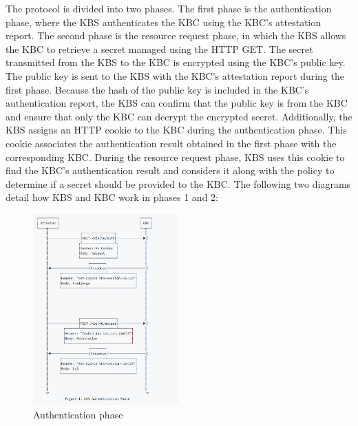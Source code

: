 The protocol is divided into two phases. The first phase is the authentication phase, where the KBS authenticates the KBC using the KBC's attestation report. The second phase is the resource request phase, in which the KBS allows the KBC to retrieve a secret managed using the HTTP GET.  
The secret transmitted from the KBS to the KBC is encrypted using the KBC's public key. The public key is sent to the KBS with the KBC's attestation report during the first phase. Because the hash of the public key is included in the KBC's authentication report, the KBS can confirm that the public key is from the KBC and ensure that only the KBC can decrypt the encrypted secret. Additionally, the KBS assigns an HTTP cookie to the KBC during the authentication phase. This cookie associates the authentication result obtained in the first phase with the corresponding KBC. During the resource 
request phase, KBS uses this cookie to find the KBC's authentication result and considers it along with the policy to determine if a secret should be provided to the KBC. The following two diagrams detail how KBS and KBC work in phases 1 and 2:


\begin{figure}[htp]
    \centering
    \includegraphics[width=0.5\textwidth]{images/attestation.PNG}
    \caption[Authentication phase]{Authentication phase}
    \label{fig:Authentication}
\end{figure}

